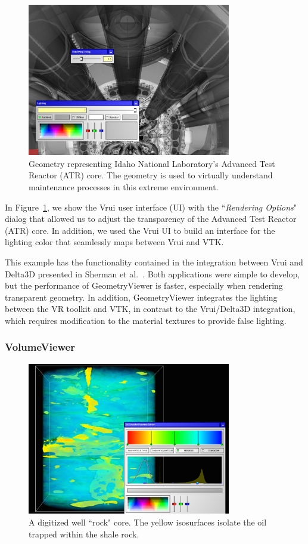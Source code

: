 \begin{figure}[h!]
 \centering
 \includegraphics[width=3.5in]{images/vessel.png}
 \caption{Geometry representing Idaho National Laboratory's Advanced Test Reactor (ATR) core. The geometry is used to virtually understand maintenance processes in this extreme environment.}
 \label{fig:vessel}
\end{figure}

In Figure~\ref{fig:vessel}, we show the Vrui user interface (UI) with the ``\textit{Rendering Options}" dialog that allowed us to adjust the transparency of the Advanced Test Reactor (ATR) core. In addition, we used the Vrui UI to build an interface for the lighting color that seamlessly maps between Vrui and VTK.

This example has the functionality contained in the integration between Vrui and Delta3D presented in Sherman et al.~\cite{Sherman:2010}. Both applications were simple to develop, but the performance of GeometryViewer is faster, especially when rendering transparent geometry. In addition, GeometryViewer integrates the lighting between the VR toolkit and VTK, in contrast to the Vrui/Delta3D integration, which requires modification to the material textures to provide false lighting.

\subsubsection{VolumeViewer}

\begin{figure}[h!]
 \centering
 \includegraphics[width=3.5in]{images/rock-transferfunction.png}
 \caption{A digitized well ``rock" core. The yellow isosurfaces isolate the oil trapped within the shale rock.}
 \label{fig:volume}
\end{figure}

